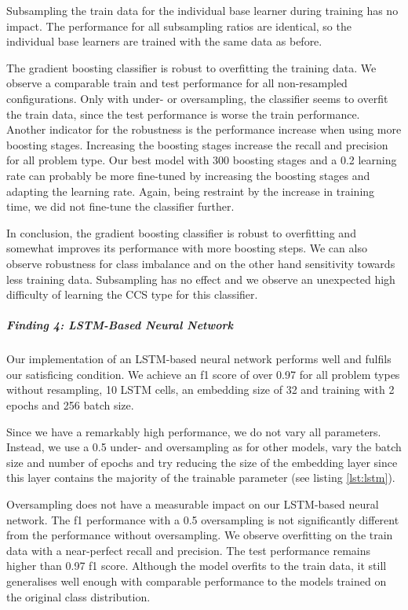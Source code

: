 Subsampling the train data for the individual base learner during training has no impact. The performance for all subsampling ratios are identical, so the individual base learners are trained with the same data as before.

The gradient boosting classifier is robust to overfitting the training data. We observe a comparable train and test performance for all non-resampled configurations. Only with under- or oversampling, the classifier seems to overfit the train data, since the test performance is worse the train performance. 
Another indicator for the robustness is the performance increase when using more boosting stages. Increasing the boosting stages increase the recall and precision for all problem type. Our best model with 300 boosting stages and a 0.2 learning rate can probably be more fine-tuned by increasing the boosting stages and adapting the learning rate. Again, being restraint by the increase in training time, we did not fine-tune the classifier further.

In conclusion, the gradient boosting classifier is robust to overfitting and somewhat improves its performance with more boosting steps. We can also observe robustness for class imbalance and on the other hand sensitivity towards less training data. Subsampling has no effect and we observe an unexpected high difficulty of learning the CCS type for this classifier.


\subparagraph{Finding 4: LSTM-Based Neural Network}
Our implementation of an LSTM-based neural network performs well and fulfils our satisficing condition. We achieve an f1 score of over 0.97 for all problem types without resampling, 10 LSTM cells, an embedding size of 32 and training with 2 epochs and 256 batch size. 


Since we have a remarkably high performance, we do not vary all parameters. Instead, we use a 0.5 under- and oversampling as for other models, vary the batch size and number of epochs and try reducing the size of the embedding layer since this layer contains the majority of the trainable parameter (see listing \ref{lst:lstm}).


Oversampling does not have a measurable impact on our LSTM-based neural network. The f1 performance with a 0.5 oversampling is not significantly different from the performance without oversampling. We observe overfitting on the train data with a near-perfect recall and precision. The test performance remains higher than 0.97 f1 score. Although the model overfits to the train data, it still generalises well enough with comparable performance to the models trained on the original class distribution.


